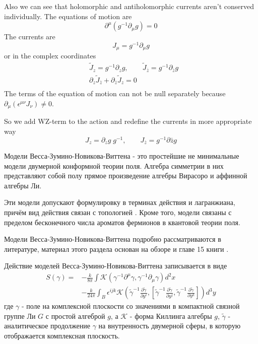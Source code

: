 \documentclass[a4paper,12pt]{article}
\theoremstyle{definition} \newtheorem{Def}{Definition}
\begin{document}
Also we can see that holomorphic and antiholomorphic currents aren't conserved individually. The equations of motion are
\begin{equation}
  \label{eq:71}
  \partial^{\mu}(g^{-1}\partial_{\mu}g)=0
\end{equation}
The currents are
\begin{equation}
  \label{eq:currents}
  J_{\mu}=g^{-1}\partial_{\mu}g
\end{equation}
or in the complex coordinates
\begin{equation}
  \label{eq:74}
  \begin{matrix}
    & \tilde{J}_z=g^{-1}\partial_z g, & \tilde{J}_{\bar{z}}=g^{-1}\partial_{\bar{z}}g\\
    & \partial_z \tilde{J}_{\bar{z}}+\partial_{\bar{z}}\tilde{J}_z=0 & \\
  \end{matrix}
\end{equation}
The terms of the equation of motion can not be null separately because $\partial_{\mu}(\epsilon^{\mu\nu}J_{\nu})\neq 0$.

So we add WZ-term to the action and redefine the currents in more appropriate way
\begin{equation}
  \label{eq:72}
  J_z=\partial_z g\;g^{-1}, \qquad J_{\bar{z}}=g^{-1}\partial{\bar z}g
\end{equation}

Модели Весса-Зумино-Новикова-Виттена - это простейшие не минимальные модели двумерной конформной теории поля. Алгебра симметрии в них представляют собой полу прямое произведение алгебры Вирасоро и аффинной алгебры Ли.

Эти модели допускают формулировку в терминах действия и лагранжиана, причём вид действия связан с топологией \cite{witten1984nab}. Кроме того, модели связаны с пределом бесконечного числа ароматов фермионов в квантовой теории поля. 

Модели Весса-Зумино-Новикова-Виттена подробно рассматриваются в литературе, материал этого раздела основан на обзоре \cite{Walton:1999xc} и главе 15 книги \cite{difrancesco1997cft}.

Действие моделей Весса-Зумино-Новикова-Виттена записывается в виде
\begin{equation}
  \label{eq:2}
  \begin{split}
  S(\gamma)= &-\frac{k}{8\pi}\int \mathcal{K} (\gamma^{-1}\partial^{\mu}\gamma,\gamma^{-1}\partial_{\mu}\gamma) d^2x \\
  &- \frac{k }{24\pi} \int_{B}\epsilon^{ijk} \mathcal{K}\left(
    \tilde \gamma^{-1}\frac{\partial \tilde \gamma}{\partial y^i},\left[
      \tilde \gamma^{-1}\frac{\partial \tilde \gamma}{\partial y^j},
      \tilde \gamma^{-1}\frac{\partial \tilde \gamma}{\partial y^k}\right]\right) d^3y
\end{split}
\end{equation}
где $\gamma$ - поле на комплексной плоскости со значениями в компактной связной группе Ли $G$ с простой алгеброй $g$, а $\mathcal{K}$ - форма Киллинга алгебры $g$, $\tilde \gamma$ - аналитическое продолжение $\gamma$ на внутренность двумерной сферы, в которую отображается комплексная плоскость.
\end{document}
